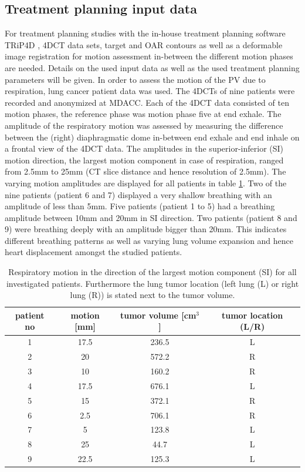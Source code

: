\subsection{Treatment planning input data}
For treatment planning studies with the in-house treatment planning software TRiP4D \cite{Ric13}, 4DCT data sets, target and OAR contours as 
well as a deformable image registration for motion assessment in-between the different motion phases are needed. Details on the used 
input data as well as the used treatment planning parameters will be given.\newline 
\newline
In order to assess the motion of the PV due to respiration, lung cancer patient data was used. The 4DCTs of nine patients were recorded and 
anonymized at MDACC. Each of the 4DCT data consisted of ten motion phases, the reference phase was 
motion phase five at end exhale. The amplitude of the respiratory motion was assessed by measuring the difference between the (right) diaphragmatic dome in-between 
end exhale and end inhale on a frontal view of the 4DCT data. The amplitudes in the superior-inferior (SI) motion direction, the 
largest motion component in case of respiration, ranged from 2.5mm to 25mm (CT slice distance and hence resolution of 2.5mm). The varying 
motion amplitudes are displayed for all patients in 
table \ref{tab:patdata}. Two of the nine patients (patient 6 and 7) displayed a very shallow breathing with an amplitude of less than 5mm. 
Five patients (patient 1 to 5) had a breathing amplitude between 10mm and 20mm in SI direction. Two patients (patient 8 and 9) were breathing 
deeply with an amplitude bigger than 20mm. This indicates different breathing patterns as well as varying lung volume 
expansion and hence heart displacement amongst the studied patients. 


\begin{table}[H]
  \centering
  \caption{Respiratory motion in the direction of the largest motion component (SI) for all investigated patients. Furthermore the lung tumor 
  location (left lung (L) or right lung (R)) is stated next to the tumor volume.}
  \begin{tabular}{|c|c|c|c|}
    \hline\hline
    patient no & motion [mm] & tumor volume [cm$^{3}$] & tumor location (L/R)\\
    \hline
    1 & 17.5 & 236.5 & L \\
    2 & 20 & 572.2 & R \\
    3 & 10 & 160.2 & R \\
    4 & 17.5 & 676.1 & L \\
    5 & 15 & 372.1 & R \\
    6 & 2.5 & 706.1 & R \\
    7 & 5 & 123.8 & L \\
    8 & 25 & 44.7 & L \\
    9 & 22.5 & 125.3 & L \\
    \hline\hline
  \end{tabular}
  \label{tab:patdata}
\end{table}

